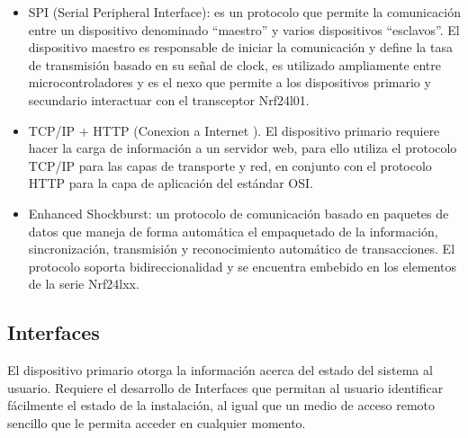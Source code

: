 \begin{itemize}
\item  SPI (Serial Peripheral Interface): es un protocolo que permite la comunicación entre un dispositivo denominado “maestro” y varios dispositivos “esclavos”. El dispositivo maestro es responsable de iniciar la comunicación y define la tasa de transmisión basado en su señal de clock, es utilizado ampliamente entre microcontroladores y es el nexo que permite a los dispositivos primario y secundario interactuar con el transceptor Nrf24l01.

\item  TCP/IP + HTTP (Conexion a Internet ).
El dispositivo primario requiere hacer la carga de información a un servidor web, para ello utiliza el protocolo TCP/IP para las capas de transporte y red, en conjunto con el protocolo HTTP para la capa de aplicación del estándar OSI.

\item  Enhanced Shockburst: un protocolo de comunicación basado en paquetes de datos que maneja de forma automática el empaquetado de la información, sincronización, transmisión y reconocimiento automático de transacciones. El protocolo soporta bidireccionalidad y se encuentra embebido en los elementos de la serie Nrf24lxx.
\end{itemize}

\subsection{Interfaces}

El dispositivo primario otorga la información acerca del estado del sistema  al usuario. Requiere el desarrollo de Interfaces que permitan al usuario identificar fácilmente el estado de la instalación, al igual que un medio de acceso remoto sencillo que le permita acceder en cualquier momento.  

